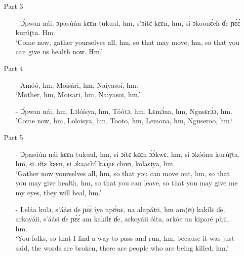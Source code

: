 \documentclass[output=paper,colorlinks,citecolor=brown]{langscibook}
\begin{document}
\begin{enumerate}
    \item[]     Part 3
    \begin{enumerate}
        \item[-]    Ɔ́pwan nái, ɔpasúún kɛɛn tukuul, hm, s’ɔítɛ kɛɛn, hm, si ɔkoonɛ́ch ɗe ɲɛ́ɛ́ kurúɽta. Hm.\\
                    `Come now, gather yourselves all, hm, so that may move, hm, so that you can  give us health now. Hm.'
    \end{enumerate}
\end{enumerate}

\begin{enumerate}
    \item[]     Part 4
    \begin{enumerate}
        \item[-]    Amóó, hm, Moisári, hm, Naiyasoi, hm.\\
                    `Mother, hm, Moisari, hm, Naiyasoi, hm.'
        \item[-]    Ɔ́pwan nái, hm, Lɔlóísya, hm, Tóótɔ, hm, Lɛmɔ́na, hm, Ngusɛrɔ́ɔ, hm.\\
                    'Come now, hm, Loloisya, hm, Tooto, hm, Lemona, hm, Nguseroo, hm.`
    \end{enumerate}
\end{enumerate}

\begin{enumerate}
    \item[]     Part 5
    \begin{enumerate}
        \item[-]    Ɔpasúún nái kɛɛn tukuul, hm, si ɔítɛ kɛɛn ɔ́ɔ́kwɛ, hm, si ɔkóónu kurúɽta, hm, si ɔítɛ kɛɛn, si ɔkaachí kɔ́ɔ́ɲɛ chʊʊ, kolasiya, hm.\\
                    `Gather now yourselves all, hm, so that you can move out, hm, so that you may give health, hm, so that you can leave, so that you may give me my eyes, they will heal, hm.'
        \item[-]    Leláa kulɔ, s’áási ɗe ɲɛ́ɛ́ íya apʊ́nɛ, na alapátii, hm am(ʊ) kakílɛ ɗe, arkoyáii, s’áási ɗe ɲɛ́ɛ́ am kakílɛ ɗe, arkoyáii ólta, arkóe na kiparé phii, hm.\\
                    `You folks, so that I find a way to pass and run, hm, because it was just said, the words are broken, there are people who are being killed, hm.'
    \end{enumerate}
\end{enumerate}
\end{document}
